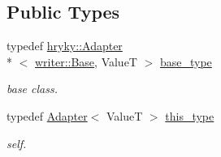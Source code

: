 \subsection*{Public Types}
\begin{DoxyCompactItemize}
\item 
\hypertarget{classhryky_1_1writer_1_1_adapter_a404ee40bd08ea08673f7e134625ef904}{typedef \hyperlink{classhryky_1_1_adapter}{hryky\-::\-Adapter}\\*
$<$ \hyperlink{classhryky_1_1writer_1_1_base}{writer\-::\-Base}, Value\-T $>$ \hyperlink{classhryky_1_1writer_1_1_adapter_a404ee40bd08ea08673f7e134625ef904}{base\-\_\-type}}\label{classhryky_1_1writer_1_1_adapter_a404ee40bd08ea08673f7e134625ef904}

\begin{DoxyCompactList}\small\item\em base class. \end{DoxyCompactList}\item 
\hypertarget{classhryky_1_1writer_1_1_adapter_a9fe895f62ad5d6fa98ea5264772b6a26}{typedef \hyperlink{classhryky_1_1writer_1_1_adapter}{Adapter}$<$ Value\-T $>$ \hyperlink{classhryky_1_1writer_1_1_adapter_a9fe895f62ad5d6fa98ea5264772b6a26}{this\-\_\-type}}\label{classhryky_1_1writer_1_1_adapter_a9fe895f62ad5d6fa98ea5264772b6a26}

\begin{DoxyCompactList}\small\item\em self. \end{DoxyCompactList}\end{DoxyCompactItemize}
